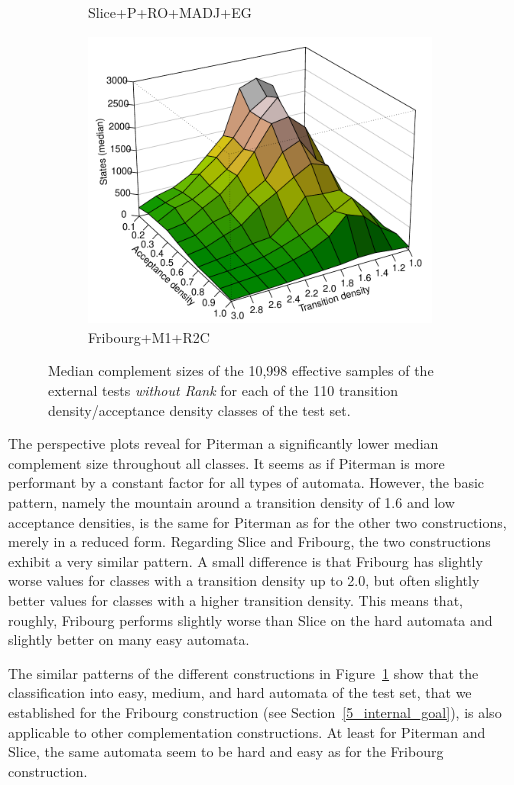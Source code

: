\begin{figure}[ht]
\begin{subfigure}[t]{\perspwidth\textwidth}
  \caption{Slice+P+RO+MADJ+EG}
  \end{subfigure}
  \hfill
  \begin{subfigure}[t]{\perspwidth\textwidth}
  \centering
  \includegraphics[width=\textwidth]{figures/r/external/goal/s.median.Fribourg+M1+R2C.pdf}
  \caption{Fribourg+M1+R2C}
  \end{subfigure}
  \hfill
\caption{Median complement sizes of the 10,998 effective samples of the external tests \textit{without Rank} for each of the 110 transition density/acceptance density classes of the \goal{} test set.}
\label{e.g.persp}
\end{figure}

The perspective plots reveal for Piterman a significantly lower median complement size throughout all classes. It seems as if Piterman is more performant by a constant factor for all types of automata. However, the basic pattern, namely the mountain around a transition density of 1.6 and low acceptance densities, is the same for Piterman as for the other two constructions, merely in a reduced form. Regarding Slice and Fribourg, the two constructions exhibit a very similar pattern. A small difference is that Fribourg has slightly worse values for classes with a transition density up to 2.0, but often slightly better values for classes with a higher transition density. This means that, roughly, Fribourg performs slightly worse than Slice on the hard automata and slightly better on many easy automata.

The similar patterns of the different constructions in Figure~\ref{e.g.persp} show that the classification into easy, medium, and hard automata of the \goal{} test set, that we established for the Fribourg construction (see Section~\ref{5_internal_goal}), is also applicable to other complementation constructions. At least for Piterman and Slice, the same automata seem to be hard and easy as for the Fribourg construction.

